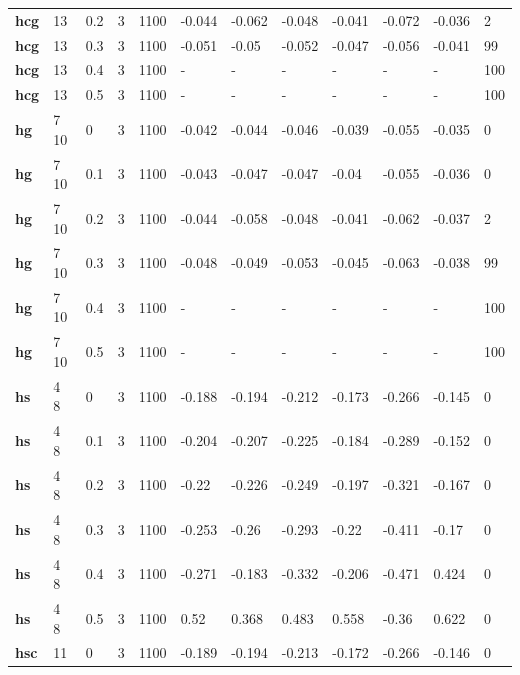 \begin{longtable}[h]{|p{0.8cm}|p{1.5cm}|p{1cm}|p{1cm}|p{1cm}|p{1cm}|p{1cm}|p{1cm}|p{1cm}|p{1cm}|p{1cm}|p{1.5cm}|}
           \\
  \textbf{hcg } &  13         & 0.2 & 3 & 1100 & -0.044 & -0.062 & -0.048 & -0.041 & -0.072 & -0.036 &   2
           \\
  \textbf{hcg } &  13         & 0.3 & 3 & 1100 & -0.051 &  -0.05 & -0.052 & -0.047 & -0.056 & -0.041 &  99
           \\
  \textbf{hcg } &  13         & 0.4 & 3 & 1100 & - & - & - & - & - & - & 100
           \\
  \textbf{hcg } &  13         & 0.5 & 3 & 1100 & - & - & - & - & - & - & 100
           \\
  \textbf{hg  } &  7 10       &   0 & 3 & 1100 & -0.042 & -0.044 & -0.046 & -0.039 & -0.055 & -0.035 &   0
           \\
  \textbf{hg  } &  7 10       & 0.1 & 3 & 1100 & -0.043 & -0.047 & -0.047 &  -0.04 & -0.055 & -0.036 &   0
           \\
  \textbf{hg  } &  7 10       & 0.2 & 3 & 1100 & -0.044 & -0.058 & -0.048 & -0.041 & -0.062 & -0.037 &   2
           \\
  \textbf{hg  } &  7 10       & 0.3 & 3 & 1100 & -0.048 & -0.049 & -0.053 & -0.045 & -0.063 & -0.038 &  99
           \\
  \textbf{hg  } &  7 10       & 0.4 & 3 & 1100 & - & - & - & - & - & - & 100
           \\
  \textbf{hg  } &  7 10       & 0.5 & 3 & 1100 & - & - & - & - & - & - & 100
           \\
  \textbf{hs  } &  4 8        &   0 & 3 & 1100 & -0.188 & -0.194 & -0.212 & -0.173 & -0.266 & -0.145 &   0
           \\
  \textbf{hs  } &  4 8        & 0.1 & 3 & 1100 & -0.204 & -0.207 & -0.225 & -0.184 & -0.289 & -0.152 &   0
           \\
  \textbf{hs  } &  4 8        & 0.2 & 3 & 1100 &  -0.22 & -0.226 & -0.249 & -0.197 & -0.321 & -0.167 &   0
           \\
  \textbf{hs  } &  4 8        & 0.3 & 3 & 1100 & -0.253 &  -0.26 & -0.293 &  -0.22 & -0.411 &  -0.17 &   0
           \\
  \textbf{hs  } &  4 8        & 0.4 & 3 & 1100 & -0.271 & -0.183 & -0.332 & -0.206 & -0.471 &  0.424 &   0
           \\
  \textbf{hs  } &  4 8        & 0.5 & 3 & 1100 &   0.52 &  0.368 &  0.483 &  0.558 &  -0.36 &  0.622 &   0
           \\
  \textbf{hsc } &  11         &   0 & 3 & 1100 & -0.189 & -0.194 & -0.213 & -0.172 & -0.266 & -0.146 &   0

\end{longtable}
